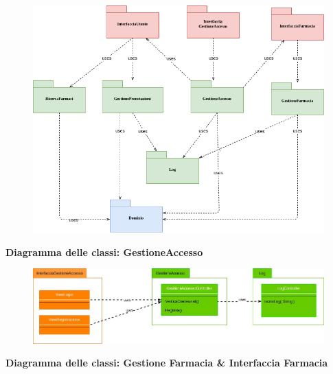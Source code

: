 \begin{figure}[h!]
    \begin{center}
        \includegraphics[scale=0.6]{immagini/Diagrammi-Package.png}
    \end{center}
\end{figure}
\hfill \break

\textbf{Diagramma delle classi: GestioneAccesso}
\hfill \break

\begin{figure}[h!]
    \begin{center}
        \includegraphics[width=\textwidth]{immagini/Diagrammi-Gestione Accesso.jpg}
    \end{center}
\end{figure}
\hfill \break

\textbf{Diagramma delle classi: Gestione Farmacia \& Interfaccia Farmacia}
\hfill \break

